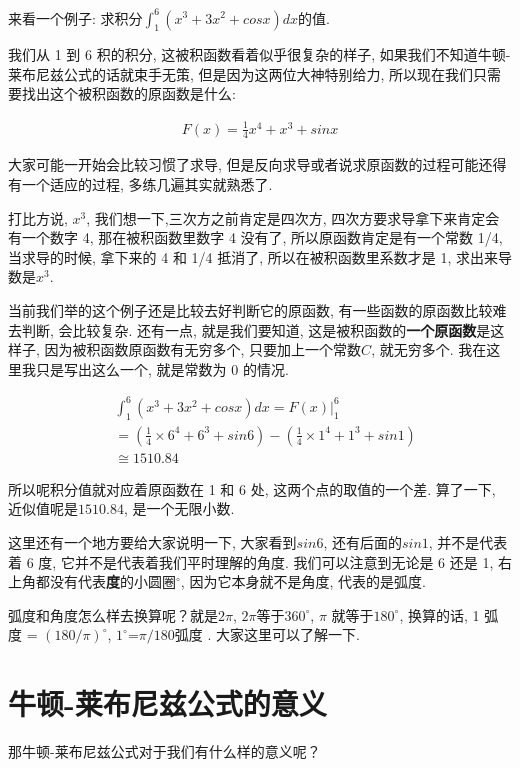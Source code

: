 来看一个例子: 求积分$\int_1^6(x^3 + 3x^2+cos x)dx$的值. 

我们从 1 到 6 积的积分, 这被积函数看着似乎很复杂的样子, 如果我们不知道牛顿-莱布尼兹公式的话就束手无策, 但是因为这两位大神特别给力, 所以现在我们只需要找出这个被积函数的原函数是什么: 

\begin{align*}
  F(x) = \frac{1}{4}x^4 + x^3 + sinx
\end{align*}

大家可能一开始会比较习惯了求导, 但是反向求导或者说求原函数的过程可能还得有一个适应的过程, 多练几遍其实就熟悉了. 

打比方说,  $x^3$, 我们想一下,三次方之前肯定是四次方, 四次方要求导拿下来肯定会有一个数字 4, 那在被积函数里数字 4 没有了, 所以原函数肯定是有一个常数 1/4, 当求导的时候, 拿下来的 4 和 1/4 抵消了, 所以在被积函数里系数才是 1, 求出来导数是$x^3$. 

当前我们举的这个例子还是比较去好判断它的原函数, 有一些函数的原函数比较难去判断, 会比较复杂. 还有一点, 就是我们要知道, 这是被积函数的\textbf{一个原函数}是这样子, 因为被积函数原函数有无穷多个, 只要加上一个常数$C$, 就无穷多个. 我在这里我只是写出这么一个, 就是常数为 0 的情况. 

\begin{align*}
  & \int_1^6(x^3 + 3x^2+cosx)dx = F(x)\vert_1^6 \\
  & = (\frac{1}{4}\times 6^4 + 6^3 +sin6) - (\frac{1}{4} \times 1^4 + 1^3 + sin1) \\
  & \cong 1510.84
\end{align*}

所以呢积分值就对应着原函数在 1 和 6 处, 这两个点的取值的一个差. 算了一下, 近似值呢是$1510.84$, 是一个无限小数. 

这里还有一个地方要给大家说明一下, 大家看到$sin6$, 还有后面的$sin1$, 并不是代表着 6 度, 它并不是代表着我们平时理解的角度. 我们可以注意到无论是 6 还是 1, 右上角都没有代表\textbf{度}的小圆圈\textbf{$^\circ$}, 因为它本身就不是角度, 代表的是弧度. 

弧度和角度怎么样去换算呢？就是$2\pi$, $2\pi$等于$360^\circ$, $\pi$ 就等于$180^\circ$, 换算的话, 1 弧度 = $(180 / \pi)^\circ$,  $1^\circ$=$\pi / 180\mbox{弧度}$ . 大家这里可以了解一下. 

\section{牛顿-莱布尼兹公式的意义}

那牛顿-莱布尼兹公式对于我们有什么样的意义呢？

